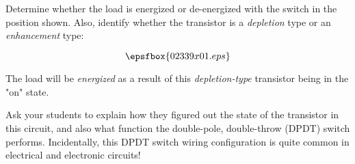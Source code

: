 

Determine whether the load is energized or de-energized with the switch in the position shown.  Also, identify whether the transistor is a {\it depletion} type or an {\it enhancement} type:

$$\epsfbox{02339x01.eps}$$







The load will be {\it energized} as a result of this {\it depletion-type} transistor being in the "on" state.







Ask your students to explain how they figured out the state of the transistor in this circuit, and also what function the double-pole, double-throw (DPDT) switch performs.  Incidentally, this DPDT switch wiring configuration is quite common in electrical and electronic circuits!




